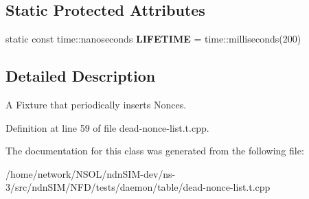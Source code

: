 \subsection*{Static Protected Attributes}
\begin{DoxyCompactItemize}
\item 
static const time\+::nanoseconds {\bfseries L\+I\+F\+E\+T\+I\+ME} = time\+::milliseconds(200)\hypertarget{classnfd_1_1tests_1_1PeriodicalInsertionFixture_a4a2acf18f7e72bd6f4e2c2a4a2955879}{}\label{classnfd_1_1tests_1_1PeriodicalInsertionFixture_a4a2acf18f7e72bd6f4e2c2a4a2955879}

\end{DoxyCompactItemize}


\subsection{Detailed Description}
A Fixture that periodically inserts Nonces. 

Definition at line 59 of file dead-\/nonce-\/list.\+t.\+cpp.



The documentation for this class was generated from the following file\+:\begin{DoxyCompactItemize}
\item 
/home/network/\+N\+S\+O\+L/ndn\+S\+I\+M-\/dev/ns-\/3/src/ndn\+S\+I\+M/\+N\+F\+D/tests/daemon/table/dead-\/nonce-\/list.\+t.\+cpp\end{DoxyCompactItemize}
